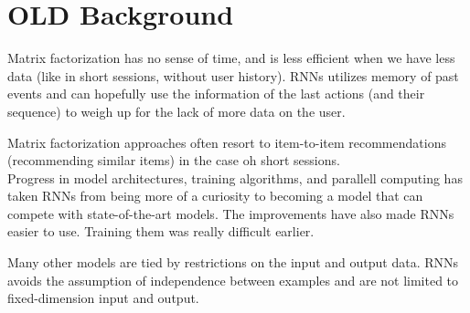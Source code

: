 \chapter{OLD Background}
Matrix factorization has no sense of time, and is less efficient when we have less data (like in short sessions, without user history). RNNs utilizes memory of past events and can hopefully use the information of the last actions (and their sequence) to weigh up for the lack of more data on the user.

Matrix factorization approaches often resort to item-to-item recommendations (recommending similar items) in the case oh short sessions.\\

Progress in model architectures, training algorithms, and parallell computing has taken RNNs from being more of a curiosity to becoming a model that can compete with state-of-the-art models. The improvements have also made RNNs easier to use. Training them was really difficult earlier.

Many other models are tied by restrictions on the input and output data. RNNs avoids the assumption of independence between examples and are not limited to fixed-dimension input and output.